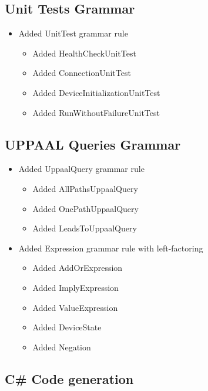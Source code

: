 \hypertarget{unit-tests-grammar}{%
\subsection{Unit Tests Grammar}\label{unit-tests-grammar}}

\begin{itemize}
\item
  Added UnitTest grammar rule

  \begin{itemize}
  \item
    Added HealthCheckUnitTest
  \item
    Added ConnectionUnitTest
  \item
    Added DeviceInitializationUnitTest
  \item
    Added RunWithoutFailureUnitTest
  \end{itemize}
\end{itemize}

\hypertarget{uppaal-queries-grammar}{%
\subsection{UPPAAL Queries Grammar}\label{uppaal-queries-grammar}}

\begin{itemize}
\item
  Added UppaalQuery grammar rule

  \begin{itemize}
  \item
    Added AllPathsUppaalQuery
  \item
    Added OnePathUppaalQuery
  \item
    Added LeadsToUppaalQuery
  \end{itemize}
\item
  Added Expression grammar rule with left-factoring

  \begin{itemize}
  \item
    Added AddOrExpression
  \item
    Added ImplyExpression
  \item
    Added ValueExpression
  \item
    Added DeviceState
  \item
    Added Negation
  \end{itemize}
\end{itemize}

\hypertarget{c-code-generation}{%
\subsection{C\# Code generation}\label{c-code-generation}}

